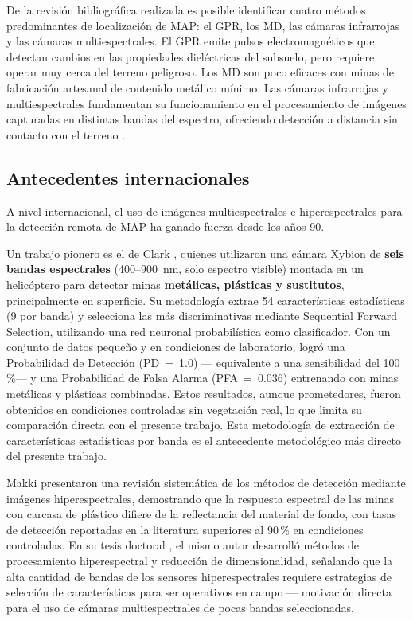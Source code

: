 De la revisión bibliográfica realizada es posible identificar cuatro métodos
predominantes de localización de \ac{MAP}: el \ac{GPR}, los \ac{MD}, las
cámaras infrarrojas y las cámaras multiespectrales. El \ac{GPR} emite pulsos
electromagnéticos que detectan cambios en las propiedades dieléctricas del
subsuelo, pero requiere operar muy cerca del terreno peligroso. Los \ac{MD}
son poco eficaces con minas de fabricación artesanal de contenido metálico
mínimo. Las cámaras infrarrojas y multiespectrales fundamentan su
funcionamiento en el procesamiento de imágenes capturadas en distintas
bandas del espectro, ofreciendo detección a distancia sin contacto con el
terreno \cite{barnawi2022}.

\subsection{Antecedentes internacionales}

A nivel internacional, el uso de imágenes multiespectrales e hiperespectrales
para la detección remota de \ac{MAP} ha ganado fuerza desde los años 90.

Un trabajo pionero es el de Clark \etal{} \cite{clark2000}, quienes
utilizaron una cámara Xybion de \textbf{seis bandas espectrales} (400--900~nm,
solo espectro visible) montada en un helicóptero para detectar minas
\textbf{metálicas, plásticas y sustitutos}, principalmente en superficie.
Su metodología extrae 54 características estadísticas (9 por banda) y selecciona
las más discriminativas mediante Sequential Forward Selection, utilizando una red
neuronal probabilística como clasificador. Con un conjunto de datos pequeño y en
condiciones de laboratorio, logró una Probabilidad de Detección (PD~=~1.0) ---
equivalente a una sensibilidad del 100\,\%--- y una Probabilidad de Falsa Alarma
(PFA~=~0.036) entrenando con minas metálicas y plásticas combinadas. Estos
resultados, aunque prometedores, fueron obtenidos en condiciones controladas sin
vegetación real, lo que limita su comparación directa con el presente trabajo.
Esta metodología de extracción de características estadísticas por banda es el
antecedente metodológico más directo del presente trabajo.

Makki \etal{} \cite{makki2017} presentaron una revisión sistemática de los
métodos de detección mediante imágenes hiperespectrales, demostrando que
la respuesta espectral de las minas con carcasa de plástico difiere de la
reflectancia del material de fondo, con tasas de detección reportadas en la
literatura superiores al 90\,\% en condiciones controladas. En su tesis doctoral
\cite{makki2017thesis}, el mismo autor desarrolló métodos de procesamiento
hiperespectral y reducción de dimensionalidad, señalando que la alta cantidad
de bandas de los sensores hiperespectrales requiere estrategias de selección
de características para ser operativos en campo --- motivación directa para el
uso de cámaras multiespectrales de pocas bandas seleccionadas.

